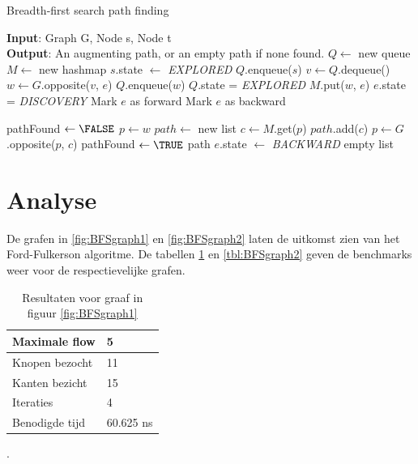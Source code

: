 \begin{algorithm}
 \caption{Breadth-first search path finding}
 \label{alg:breadthfirst}
 \begin{algorithmic}
  \REQUIRE \textbf{Input}: Graph G, Node s, Node t \\ 
\textbf{Output}: An augmenting path, or an empty path if none found.
  \STATE $Q \gets $ new queue
  \STATE $M \gets $ new hashmap
  \STATE $s$.state $\gets$ \textit{EXPLORED}
  \STATE $Q$.enqueue($s$)
   \STATE $v \gets Q$.dequeue()
    \STATE $w \gets G$.opposite($v$, $e$)
      \STATE $Q$.enqueue($w$)
      \STATE $Q$.state = \textit{EXPLORED}
      \STATE $M$.put($w$, $e$) 
      \STATE $e$.state = \textit{DISCOVERY}
         \STATE Mark $e$ as forward
      \ELSE
         \STATE Mark $e$ as backward
      \ENDIF

         \STATE pathFound $\gets \FALSE$
         \STATE $p \gets w$
         \STATE $path \gets $ new list
          \STATE $c \gets M$.get($p$) 
          \STATE $path$.add($c$)      
          \STATE $p \gets G$.opposite($p$, $c$) 
            \STATE pathFound $\gets \TRUE$ 
          \ENDIF
         \ENDWHILE
         \RETURN path
      \ENDIF
    \ENDIF
    \ELSE
      \STATE $e$.state $\gets$ \textit{BACKWARD}
    \ENDIF
   \ENDFOR
  \ENDWHILE
  \RETURN empty list 
 \end{algorithmic}
\end{algorithm}

\clearpage

\section{Analyse}
De grafen in \ref{fig:BFSgraph1} en \ref{fig:BFSgraph2} laten de uitkomst zien van het Ford-Fulkerson algoritme. De tabellen \ref{tbl:BFSgraph1} en \ref{tbl:BFSgraph2} geven de benchmarks weer voor de respectievelijke grafen.

\begin{table}[h]
 \begin{tabularx}{\linewidth}{| l | X |}
 \hline
 Maximale flow & 5 \\
 \hline
 Knopen bezocht & 11 \\
 \hline
 Kanten bezicht & 15 \\
 \hline
 Iteraties & 4 \\
 \hline
 Benodigde tijd & 60.625 ns \\
 \hline
\end{tabularx}
\centering
\caption{Resultaten voor graaf in figuur \ref{fig:BFSgraph1}}.
\label{tbl:BFSgraph1}
\end{table}

